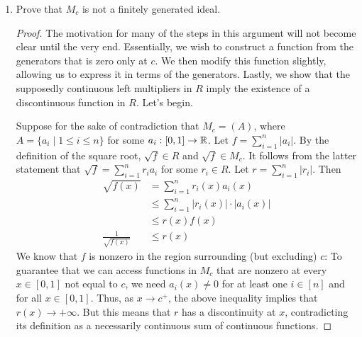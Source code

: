 \documentclass[../psets.tex]{subfiles}
\begin{document}
\begin{enumerate}
\begin{enumerate}[label={\textbf{(\alph*)}}]
\begin{proof}
        \end{proof}
        \item Prove that $M_c$ is not a finitely generated ideal.
        \begin{proof}



            The motivation for many of the steps in this argument will not become clear until the very end. Essentially, we wish to construct a function from the generators that is zero only at $c$. We then modify this function slightly, allowing us to express it in terms of the generators. Lastly, we show that the supposedly continuous left multipliers in $R$ imply the existence of a discontinuous function in $R$. Let's begin.\par
            Suppose for the sake of contradiction that $M_c=(A)$, where $A=\{a_i\mid 1\leq i\leq n\}$ for some $a_i:[0,1]\to\mathbb{R}$. Let $f=\sum_{i=1}^n|a_i|$. By the definition of the square root, $\sqrt{f}\in R$ and $\sqrt{f}\in M_c$. It follows from the latter statement that $\sqrt{f}=\sum_{i=1}^nr_ia_i$ for some $r_i\in R$. Let $r=\sum_{i=1}^n|r_i|$. Then
            \begin{align*}
                \sqrt{f(x)} &= \sum_{i=1}^nr_i(x)a_i(x)\\
                &\leq \sum_{i=1}^n|r_i(x)|\cdot|a_i(x)|\\
                &\leq r(x)f(x)\\
                \frac{1}{\sqrt{f(x)}} &\leq r(x)
            \end{align*}
            We know that $f$ is nonzero in the region surrounding (but excluding) $c$: To guarantee that we can access functions in $M_c$ that are nonzero at every $x\in[0,1]$ not equal to $c$, we need $a_i(x)\neq 0$ for at least one $i\in[n]$ and for all $x\in[0,1]$. Thus, as $x\to c^+$, the above inequality implies that $r(x)\to +\infty$. But this means that $r$ has a discontinuity at $x$, contradicting its definition as a necessarily continuous sum of continuous functions.
        \end{proof}
    \end{enumerate}
\end{enumerate}
\end{document}
